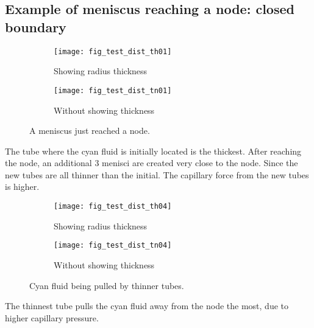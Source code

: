 \subsection{Example of meniscus reaching a node: closed boundary} \label{sec:example-meniscus-in-node}
	\begin{figure}[H]
		\centering
		
		\begin{subfigure}{0.42\textwidth}
			\texttt{[image: fig\_test\_dist\_th01]}
			\caption{Showing radius thickness}
		\end{subfigure}
		\hfill
		\begin{subfigure}{0.40\textwidth}
			\texttt{[image: fig\_test\_dist\_tn01]}
			\caption{Without showing thickness}
		\end{subfigure}
		
		\caption{A meniscus just reached a node.}
	\end{figure}
	
	The tube where the cyan fluid is initially located is the thickest. After reaching the node, an additional 3 menisci are created very close to the node. Since the new tubes are all thinner than the initial. The capillary force from the new tubes is higher.
	
	\begin{figure}[H]
		\centering
		
		\begin{subfigure}{0.42\textwidth}
			\texttt{[image: fig\_test\_dist\_th04]}
			\caption{Showing radius thickness}
		\end{subfigure}
		\hfill
		\begin{subfigure}{0.40\textwidth}
			\texttt{[image: fig\_test\_dist\_tn04]}
			\caption{Without showing thickness}
		\end{subfigure}
		
		\caption{Cyan fluid being pulled by thinner tubes.}
	\end{figure}
	
	The thinnest tube pulls the cyan fluid away from the node the most, due to higher capillary pressure.
	
	
